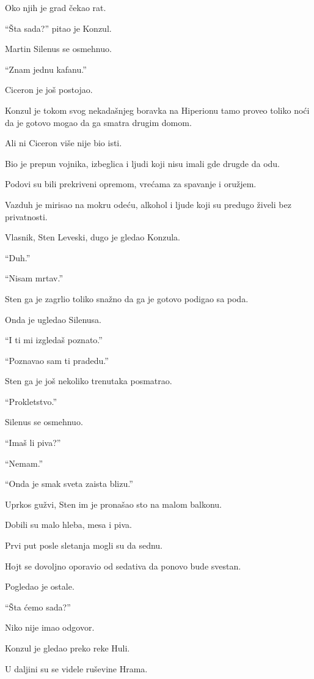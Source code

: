 Oko njih je grad čekao rat.

\bigskip

``Šta sada?'' pitao je Konzul.

Martin Silenus se osmehnuo.

``Znam jednu kafanu.''

\bigskip

Ciceron je još postojao.

Konzul je tokom svog nekadašnjeg boravka na Hiperionu tamo proveo toliko noći da je gotovo mogao da ga smatra drugim domom.

Ali ni Ciceron više nije bio isti.

Bio je prepun vojnika, izbeglica i ljudi koji nisu imali gde drugde da odu.

Podovi su bili prekriveni opremom, vrećama za spavanje i oružjem.

Vazduh je mirisao na mokru odeću, alkohol i ljude koji su predugo živeli bez privatnosti.

Vlasnik, Sten Leveski, dugo je gledao Konzula.

``Duh.''

``Nisam mrtav.''

Sten ga je zagrlio toliko snažno da ga je gotovo podigao sa poda.

Onda je ugledao Silenusa.

``I ti mi izgledaš poznato.''

``Poznavao sam ti pradedu.''

Sten ga je još nekoliko trenutaka posmatrao.

``Prokletstvo.''

Silenus se osmehnuo.

``Imaš li piva?''

``Nemam.''

``Onda je smak sveta zaista blizu.''

Uprkos gužvi, Sten im je pronašao sto na malom balkonu.

Dobili su malo hleba, mesa i piva.

Prvi put posle sletanja mogli su da sednu.

Hojt se dovoljno oporavio od sedativa da ponovo bude svestan.

Pogledao je ostale.

``Šta ćemo sada?''

Niko nije imao odgovor.

Konzul je gledao preko reke Huli.

U daljini su se videle ruševine Hrama.

